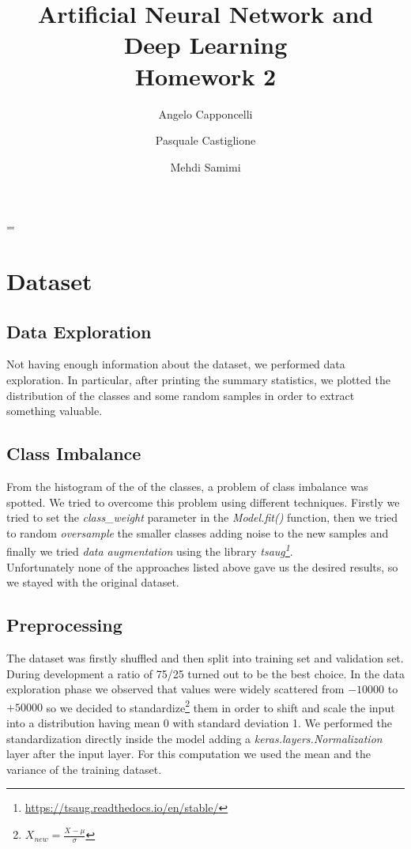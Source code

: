 \documentclass[11pt]{article}
\title{
	\vspace{-2cm}
	\textbf{Artificial Neural Network and Deep Learning}\\
	\large Homework 2
}
\date{}
\author{Angelo Capponcelli \and Pasquale Castiglione \and Mehdi Samimi}
\newcommand{\justified}
{
	\tolerance=1
	\emergencystretch=\maxdimen
	\hyphenpenalty=10000
	\hbadness=10000
}
\begin{document}
\maketitle
\justified

\section*{Dataset}
\subsection*{Data Exploration}
Not having enough information about the dataset, we performed data exploration. In particular, after printing the summary statistics, we plotted the distribution of the classes and some random samples in order to extract something valuable.
\subsection*{Class Imbalance}
From the histogram of the of the classes, a problem of class imbalance was spotted. We tried to overcome this problem using different techniques. Firstly we tried to set the \emph{class\_weight} parameter in the \emph{Model.fit()} function, then we tried to random \emph{oversample} the smaller classes adding noise to the new samples and finally we tried \emph{data augmentation} using the library \emph{tsaug\footnote{\url{https://tsaug.readthedocs.io/en/stable/}}}.\\
Unfortunately none of the approaches listed above gave us the desired results, so we stayed with the original dataset.

\subsection*{Preprocessing}
The dataset was firstly shuffled and then split into training set and validation set. During development a ratio of 75/25 turned out to be the best choice. In the data exploration phase we observed that values were widely scattered from $-10000$ to $+50000$ so we decided to standardize\footnote{$X_{new} = \frac{X - \mu}{\sigma} $} them in order to shift and scale the input into a distribution having mean 0 with standard deviation 1. We performed the standardization directly inside the model adding a \emph{keras.layers.Normalization} layer after the input layer. For this computation we used the mean and the variance of the training dataset.
\end{document}
